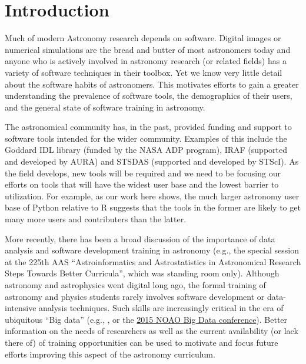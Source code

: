 \section{Introduction}
\label{sec:intro}

Much of modern Astronomy research depends on software. Digital images or numerical simulations are the bread and butter of most astronomers today and anyone who is actively involved in astronomy research (or related fields) has a variety of software techniques in their toolbox. Yet we know very little detail about the software habits of astronomers. This motivates efforts to gain a greater understanding the prevalence of software tools, the demographics of their users, and the general state of software training in astronomy.

The astronomical community has, in the past, provided funding and support to software tools intended for the wider community. Examples of this include the Goddard IDL library (funded by the NASA ADP program), IRAF (supported and developed by AURA) and STSDAS (supported and developed by STScI). As the field develops, new tools will be required and we need to be focusing our efforts on tools that will have the widest user base and the lowest barrier to utilization. For example, as our work here shows, the much larger astronomy user base of Python relative to R suggests that the tools in the former are likely to get many more users and contributers than the latter. 

More recently, there has been a broad discussion of the importance of data analysis and software development training in astronomy (e.g., the special session at the 225th AAS ``Astroinformatics and Astrostatistics in Astronomical Research Steps Towards Better Curricula'', which was standing room only). Although astronomy and astrophysics went digital long ago, the formal training of astronomy and physics students rarely involves software development or data-intensive analysis techniques. Such skills are increasingly critical in the era of ubiquitous ``Big data'' (e.g., \citet{Berriman_2011}, or the \href{http://www.noao.edu/meetings/bigdata/}{2015 NOAO Big Data conference}). Better information on the needs of researchers as well as the current availability (or lack there of) of training opportunities can be used to motivate and focus future efforts improving this aspect of the astronomy curriculum. 

